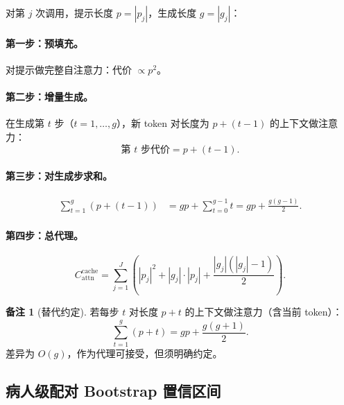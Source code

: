 \documentclass[11pt,a4paper]{article}
\theoremstyle{definition}
\newtheorem{remark}{备注}[section]
\begin{document}
对第 $j$ 次调用，提示长度 $p = |p_j|$，生成长度 $g = |g_j|$：

\paragraph{第一步：预填充。} 对提示做完整自注意力：代价 $\propto p^2$。

\paragraph{第二步：增量生成。} 在生成第 $t$ 步（$t=1,\ldots,g$），新 token 对长度为 $p+(t-1)$ 的上下文做注意力：
\begin{equation}
\text{第 } t \text{ 步代价} = p + (t-1).
\end{equation}

\paragraph{第三步：对生成步求和。}
\begin{align}
\sum_{t=1}^{g}(p + (t-1))
&= gp + \sum_{t=0}^{g-1} t = gp + \frac{g(g-1)}{2}. \label{eq:gensum}
\end{align}

\paragraph{第四步：总代理。}
\begin{equation}\label{eq:cache}
\boxed{
C_{\mathrm{attn}}^{\mathrm{cache}} = \sum_{j=1}^{J}\left(
    |p_j|^2 + |g_j|\cdot|p_j| + \frac{|g_j|(|g_j|-1)}{2}
\right).
}
\end{equation}

\begin{remark}[替代约定]
若每步 $t$ 对长度 $p+t$ 的上下文做注意力（含当前 token）：
\[
\sum_{t=1}^{g}(p+t) = gp + \frac{g(g+1)}{2}.
\]
差异为 $O(g)$，作为代理可接受，但须明确约定。
\end{remark}


\subsection{病人级配对 Bootstrap 置信区间}
\end{document}
